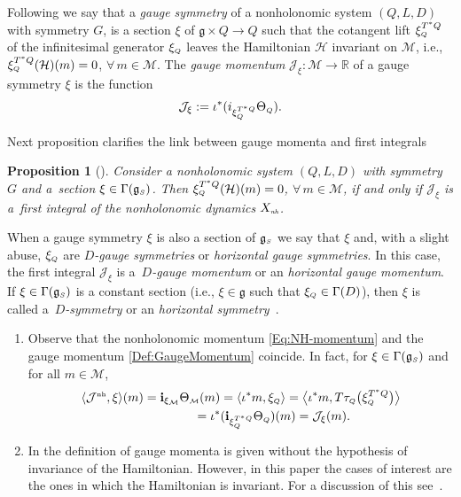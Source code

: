 \documentclass[10pt,a4paper]{amsart}
\numberwithin{equation}{section}
\newtheorem{Proposition}[Theorem]{Proposition}
 { \theoremstyle{definition}
\newtheorem{Definition}[Theorem]{Definition}
\newtheorem{Example}[Theorem]{Example}
\newtheorem{Remark}[Theorem]{Remark}
\newtheorem{Remarks}[Theorem]{Remarks} }
\def\M{\mathcal{M}}
\def\J{\mathcal{J}}
\def\Ham{\mathcal{H}}
\def\R{\mathbb{R}}
\def\g{\mathfrak{g}}
\def\nh{{\mbox{\tiny{nh}}}}
\def\subM{{\mbox{\tiny{$\M$}}}}
\def\subSS{{\mbox{\tiny{$S$}}}}
\def\subQQ{{\mbox{\tiny{$Q$}}}}
\begin{document}
Following \cite{FSG2008,FSG2009} we say that a {\it gauge symmetry}
of a nonholonomic system $(Q,L,D)$ with symmetry $G$, is a
section $\xi$ of $\g\times Q\to Q$ such that the cotangent lift
$\xi_{\mbox{\tiny{$Q$}}}^{T^*Q}$ of the inf\/initesimal generator
$\xi_{\mbox{\tiny{$Q$}}}$ leaves the Hamiltonian $\Ham$ invariant on $\M$, i.e.,
$\xi_{\mbox{\tiny{$Q$}}}^{T^*Q}(\Ham)(m) = 0$, $\forall\, m\in \M$.
The {\it gauge momentum}
${\mathcal J}_\xi\colon \M\to \R$ of a gauge symmetry $\xi$ is the function
 \begin{gather}\label{Def:GaugeMomentum}
    {\mathcal J}_\xi := \iota^*(i_{\xi^{T^*Q}_{\mbox{\tiny{$Q$}}}}  \Theta_{\mbox{\tiny{$Q$}}})  .
 \end{gather}

Next proposition clarif\/ies the link between gauge momenta and f\/irst integrals

\begin{Proposition}[\cite{FRS2007}]\label{Prop:FRS}
 Consider a nonholonomic system $(Q,L,D)$ with symmetry $G$ and a~section
 $\xi\in \Gamma(\g_\subSS)$. Then $\xi_{\mbox{\tiny{$Q$}}}^{T^*Q} (\Ham) (m) = 0$, $\forall\, m\in\M$,  if and only if
 ${\mathcal J}_\xi$ is a~first integral of the nonholonomic dynamics $X_{\emph\nh}$.
\end{Proposition}

When a gauge symmetry $\xi$ is also a section of $\g_\subSS$
we say that $\xi$ and, with a slight abuse, $\xi_{\mbox{\tiny{$Q$}}}$
are {\it $D$-gauge symmetries} or {\it horizontal gauge symmetries}.
In this case, the f\/irst integral $\J_\xi$ is a~{\it $D$-gauge momentum} or an
{\it horizontal gauge momentum}. If $\xi \in \Gamma( \mathfrak{g}_\subSS)$
is a constant section (i.e., $\xi \in \mathfrak{g}$ such that
$\xi_{\subQQ} \in \Gamma(D)$), then $\xi$ is called a~{\it $D$-symmetry} or an
{\it horizontal symmetry}~\cite{BKMM,FSG2008}.

\begin{Remarks}\quad
  \begin{enumerate}\itemsep=0pt
    \item[$(i)$] Observe that the nonholonomic momentum \eqref{Eq:NH-momentum}
    and the gauge momentum \eqref{Def:GaugeMomentum} coincide. In fact,
    for $\xi\in \Gamma(\g_\subSS)$ and for all $m\in \M$,
    \begin{gather*} \langle \J^\nh, \xi\rangle (m)  =
      {\bf i}_{\xi_\subM}
      \Theta_\subM (m) = \langle \iota^*m,  \xi_\subQQ \rangle =  \big\langle \iota^* m,
      T\tau_\subQQ \big( \xi_\subQQ^{T^*Q} \big) \big\rangle \\
      \hphantom{\langle \J^\nh, \xi\rangle (m) }{}
      =  \iota^*({\bf i}_{\xi^{T^*Q}_{\mbox{\tiny{$Q$}}}}
      \Theta_{\mbox{\tiny{$Q$}}}) (m)= \J_\xi(m).
    \end{gather*}
    \item[$(ii)$] In \cite{FSG2012} the def\/inition of gauge momenta is given without the
    hypothesis of invariance of the Hamiltonian. However, in this paper the cases
    of interest are the ones in which the Hamiltonian is invariant.
    For a discussion of this see~\cite{FSG2012}.
  \end{enumerate}
\end{Remarks}
\end{document}
